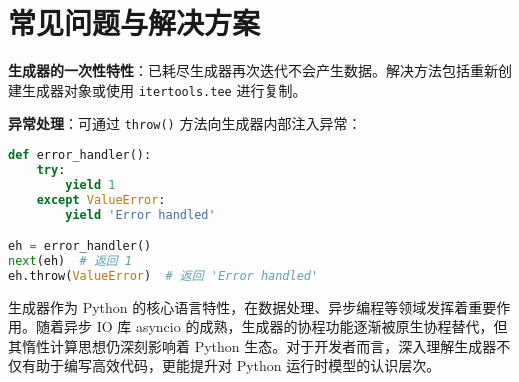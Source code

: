 \chapter{常见问题与解决方案}
\textbf{生成器的一次性特性}：已耗尽生成器再次迭代不会产生数据。解决方法包括重新创建生成器对象或使用 \verb!itertools.tee! 进行复制。\par
\textbf{异常处理}：可通过 \verb!throw()! 方法向生成器内部注入异常：\par
\begin{lstlisting}[language=python]
def error_handler():
    try:
        yield 1
    except ValueError:
        yield 'Error handled'

eh = error_handler()
next(eh)  # 返回 1
eh.throw(ValueError)  # 返回 'Error handled'
\end{lstlisting}
生成器作为 Python 的核心语言特性，在数据处理、异步编程等领域发挥着重要作用。随着异步 IO 库 asyncio 的成熟，生成器的协程功能逐渐被原生协程替代，但其惰性计算思想仍深刻影响着 Python 生态。对于开发者而言，深入理解生成器不仅有助于编写高效代码，更能提升对 Python 运行时模型的认识层次。\par
